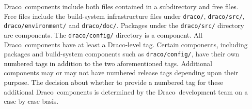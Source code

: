 \documentclass[11pt]{nmemo}
\newcommand{\draco}{{\normalfont\normalsize\sffamily Draco}}
\newcommand{\stable}{{\normalfont\normalsize\ttfamily last\_stable}}
\begin{document}
\draco\ components include both files contained in a subdirectory and
free files.  Free files include the build-system infrastructure files
under \texttt{draco/}, \texttt{draco/src/},
\texttt{draco/environment/} and \texttt{draco/doc/}.  Packages under
the \texttt{draco/src/} directory are components.  The
\texttt{draco/config/} directory is a component.  All
\draco\ components have at least a \draco-level tag.  Certain
components, including packages and build-system components such as
\texttt{draco/config/}, have their own numbered tags in addition to
the two aforementioned tags.  Additional components may or may not
have numbered release tags depending upon their purpose.  The decision
about whether to provide a numbered tag for these additional
\draco\ components is determined by the \draco\ development team on a
case-by-case basis.  
\end{document}

